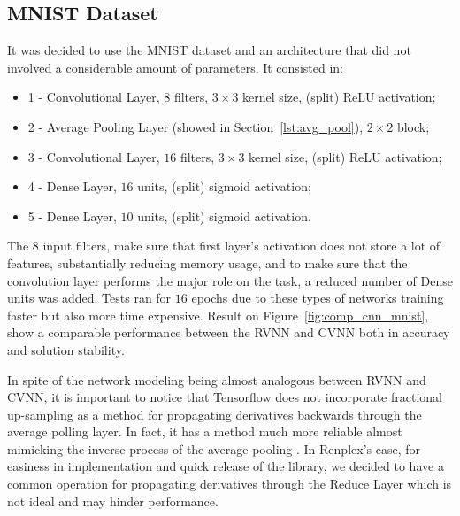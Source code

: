 \subsection{MNIST Dataset}
It was decided to use the MNIST dataset and an architecture that did not involved a considerable amount of parameters. It consisted in:
 
 \begin{itemize}
 	\item 1 - Convolutional Layer, $  8 $ filters, $ 3 \times 3 $ kernel size, (split) ReLU activation;
 	\item 2 - Average Pooling Layer (showed in Section~\ref{lst:avg_pool}), $ 2 \times 2 $ block;
 	\item 3 - Convolutional Layer, $ 16 $ filters, $ 3 \times 3 $ kernel size, (split) ReLU activation;
 	\item 4 - Dense Layer, $ 16 $ units, (split) sigmoid activation;
 	\item 5 - Dense Layer, $ 10 $ units, (split) sigmoid activation.
 \end{itemize}
 
The $ 8 $ input filters, make sure that first layer's activation does not store a lot of features, substantially reducing memory usage, and to make sure that the convolution layer performs the major role on the task, a reduced number of Dense units was added. Tests ran for $ 16 $ epochs due to these types of networks training faster but also more time expensive. Result on Figure~\ref{fig:comp_cnn_mnist}, show a comparable performance between the RVNN and CVNN both in accuracy and solution stability.

In spite of the network modeling being almost analogous between RVNN and CVNN, it is important to notice that Tensorflow does not incorporate fractional up-sampling as a method for propagating derivatives backwards through the average polling layer. In fact, it has a method much more reliable almost mimicking the inverse process of the average pooling \parencite{tensorflow2023}. In Renplex's case, for easiness in implementation and quick release of the library, we decided to have a common operation for propagating derivatives through the Reduce Layer which is not ideal and may hinder performance.

